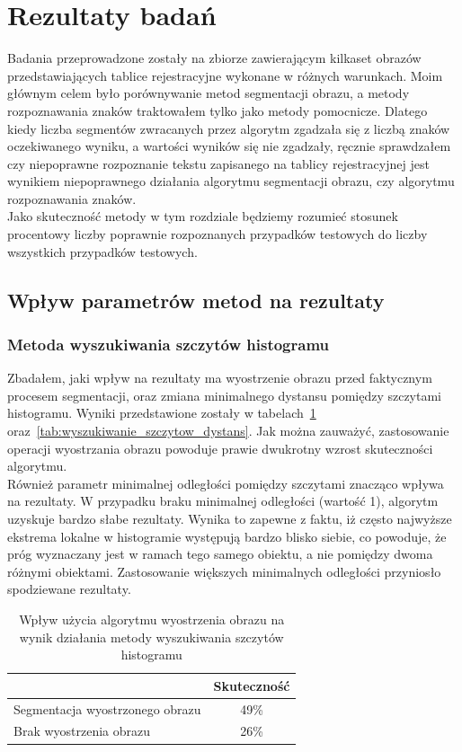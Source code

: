 \section{Rezultaty badań}
Badania przeprowadzone zostały na zbiorze zawierającym kilkaset obrazów przedstawiających tablice rejestracyjne wykonane w różnych warunkach. Moim głównym celem było porównywanie metod segmentacji obrazu, a metody rozpoznawania znaków traktowałem tylko jako metody pomocnicze. Dlatego kiedy liczba segmentów zwracanych przez algorytm zgadzała się z liczbą znaków oczekiwanego wyniku, a wartości wyników się nie zgadzały, ręcznie sprawdzałem czy niepoprawne rozpoznanie tekstu zapisanego na tablicy rejestracyjnej jest wynikiem niepoprawnego działania algorytmu segmentacji obrazu, czy algorytmu rozpoznawania znaków. \\
Jako skuteczność metody w tym rozdziale będziemy rozumieć stosunek procentowy liczby poprawnie rozpoznanych przypadków testowych do liczby wszystkich przypadków testowych.

\subsection{Wpływ parametrów metod na rezultaty}
\subsubsection{Metoda wyszukiwania szczytów histogramu}
Zbadałem, jaki wpływ na rezultaty ma wyostrzenie obrazu przed faktycznym procesem segmentacji, oraz zmiana minimalnego dystansu pomiędzy szczytami histogramu. Wyniki przedstawione zostały w tabelach~\ref{tab:wyszukiwanie_szczytow_wyostrz} oraz~\ref{tab:wyszukiwanie_szczytow_dystans}. Jak można zauważyć, zastosowanie operacji wyostrzania obrazu powoduje prawie dwukrotny wzrost skuteczności algorytmu. \\
Również parametr minimalnej odległości pomiędzy szczytami znacząco wpływa na rezultaty. W przypadku braku minimalnej odległości (wartość 1), algorytm uzyskuje bardzo słabe rezultaty. Wynika to zapewne z faktu, iż często najwyższe ekstrema lokalne w histogramie występują bardzo blisko siebie, co powoduje, że próg wyznaczany jest w ramach tego samego obiektu, a nie pomiędzy dwoma różnymi obiektami. Zastosowanie większych minimalnych odległości przyniosło spodziewane rezultaty.

\begin {table}[H]
  \begin{center}
    \begin{tabular}{l | c}
      \space & Skuteczność \\
      \hline
      Segmentacja wyostrzonego obrazu & 49\% \\
      Brak wyostrzenia obrazu & 26\%
    \end{tabular}
    \caption {Wpływ użycia algorytmu wyostrzenia obrazu na wynik działania metody wyszukiwania szczytów histogramu}
    \label{tab:wyszukiwanie_szczytow_wyostrz} 
  \end{center}
\end {table}

